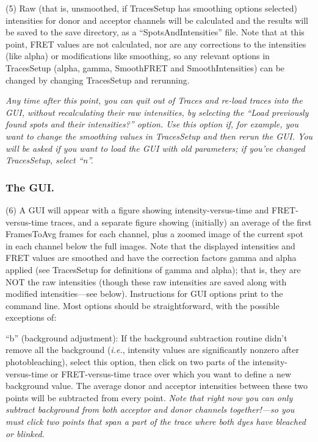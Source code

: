 \documentclass[11pt]{article}
\begin{document}
\noindent (5) Raw (that is, unsmoothed, if TracesSetup has smoothing options selected) intensities for donor and acceptor channels will be calculated and the results will be saved to the save directory, as a ``SpotsAndIntensities'' file.  Note that at this point, FRET values are not calculated, nor are any corrections to the intensities (like alpha) or modifications like smoothing, so any relevant options in TracesSetup (alpha, gamma, SmoothFRET and SmoothIntensities) can be changed by changing TracesSetup and rerunning.

{\it Any time after this point, you can quit out of Traces and re-load traces into the GUI, without recalculating their raw intensities, by selecting the ``Load previously found spots and their intensities?'' option.  Use this option if, for example, you want to change the smoothing values in TracesSetup and then rerun the GUI.  You will be asked if you want to load the GUI with old parameters; if you've changed TracesSetup, select ``n''.}

\subsubsection{The GUI.}\label{sec:GUI}

\noindent (6) A GUI will appear with a figure showing intensity-versus-time and FRET-versus-time traces, and a separate figure showing (initially) an average of the first FramesToAvg frames for each channel, plus a zoomed image of the current spot in each channel below the full images. Note that the displayed intensities and FRET values are smoothed and have the correction factors gamma and alpha applied (see TracesSetup for definitions of gamma and alpha); that is, they are NOT the raw intensities (though these raw intensities are saved along with modified intensities---see below). Instructions for GUI options print to the command line. Most options should be straightforward, with the possible exceptions of:

``b'' (background adjustment): If the background subtraction routine didn't remove all the background ({\it i.e.}, intensity values are significantly nonzero after photobleaching), select this option, then click on two parts of the intensity-versus-time or FRET-versus-time trace over which you want to define a new background value. The average donor and acceptor intensities between these two points will be subtracted from every point.  {\it Note that right now you can only subtract background from both acceptor and donor channels together!---so you must click two points that span a part of the trace where both dyes have bleached or blinked.}
\end{document}
